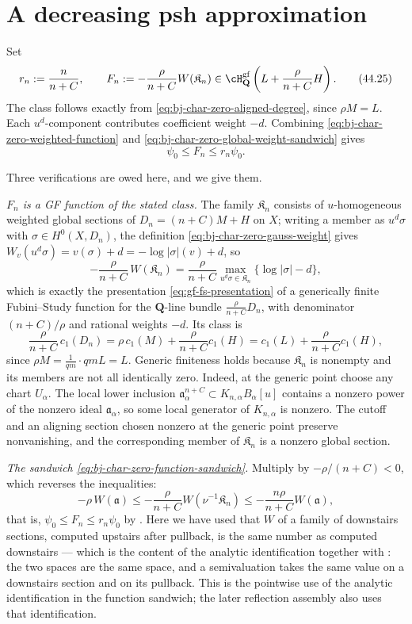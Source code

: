 \section{A decreasing psh approximation}
\label{sec:ch44-decreasing}

Set
\[
 r_n:=\frac n{n+C},
 \qquad
 F_n:=-\frac{\rho}{n+C}W(\mathfrak K_n)
       \in\cH^{\mathrm{gf}}_{\mathbf Q}
          \left(L+\frac{\rho}{n+C}H\right).
\tag{44.25}\label{eq:bj-char-zero-gf-approximants}
\]
The class follows exactly from
\eqref{eq:bj-char-zero-aligned-degree}, since $\rho M=L$.
Each $u^d$-component contributes coefficient weight $-d$.
Combining
\eqref{eq:bj-char-zero-weighted-function} and
\eqref{eq:bj-char-zero-global-weight-sandwich} gives
\[
                         \psi_0\le F_n\le r_n\psi_0.
\tag{44.26}\label{eq:bj-char-zero-function-sandwich}
\]

Three verifications are owed here, and we give them.

\emph{$F_n$ is a GF function of the stated class.}  The family
$\mathfrak K_n$ consists of $u$-homogeneous weighted global sections of
$D_n=(n+C)M+H$ on $X$; writing a member as $u^{d}\sigma$ with
$\sigma\in H^0(X,D_n)$, the definition
\eqref{eq:bj-char-zero-gauss-weight} gives
$W_v(u^d\sigma)=v(\sigma)+d=-\log|\sigma|(v)+d$, so
\[
 -\frac{\rho}{n+C}\,W(\mathfrak K_n)
 =\frac{\rho}{n+C}\max_{u^d\sigma\in\mathfrak K_n}
   \bigl\{\log|\sigma|-d\bigr\},
\]
which is exactly the presentation \eqref{eq:gf-fs-presentation} of a
generically finite Fubini--Study function for the $\mathbf Q$-line bundle
$\frac{\rho}{n+C}D_n$, with denominator $(n+C)/\rho$ and rational
weights $-d$.  Its class is
\[
 \frac{\rho}{n+C}\,c_1(D_n)
 =\rho\,c_1(M)+\frac{\rho}{n+C}c_1(H)
 =c_1(L)+\frac{\rho}{n+C}c_1(H),
\]
since $\rho M=\frac1{qm}\cdot qmL=L$.  Generic finiteness holds because
$\mathfrak K_n$ is nonempty and its members are not all identically zero.
Indeed, at the generic point choose any chart $U_\alpha$.  The local lower
inclusion
$\mathfrak a_\alpha^{n+C}\subset K_{n,\alpha}B_\alpha[u]$
contains a nonzero power of the nonzero ideal $\mathfrak a_\alpha$, so
some local generator of $K_{n,\alpha}$ is nonzero.  The cutoff and an
aligning section chosen nonzero at the generic point preserve nonvanishing,
and the corresponding member of $\mathfrak K_n$ is a nonzero global
section.

\emph{The sandwich \eqref{eq:bj-char-zero-function-sandwich}.}  Multiply
 by $-\rho/(n+C)<0$, which reverses the
inequalities:
\[
 -\rho\,W(\mathfrak a)
 \le-\frac{\rho}{n+C}W(\nu^{-1}\mathfrak K_n)
 \le-\frac{n\rho}{n+C}W(\mathfrak a),
\]
that is, $\psi_0\le F_n\le r_n\psi_0$ by
.  Here we have used that $W$ of a family
of downstairs sections, computed upstairs after pullback, is the same number
as computed downstairs --- which is the content of the analytic
identification  together with
: the two spaces are the same
space, and a semivaluation takes the same value on a downstairs section and
on its pullback.  This is the pointwise use of the analytic identification in the
function sandwich; the later reflection assembly also uses that
identification.

